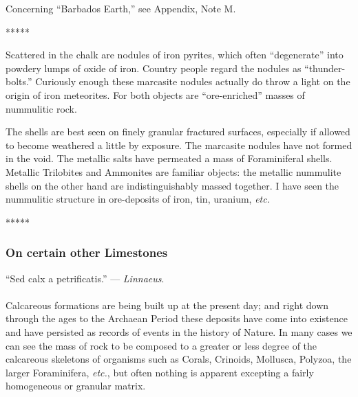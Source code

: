 \documentclass[a4paper, 12pt, oneside, landscape]{article}
\begin{document}
Concerning ``Barbados Earth,'' see Appendix, Note M.

\centerline{*\hspace{15mm}*\hspace{15mm}*\hspace{15mm}*\hspace{15mm}*}
\bigskip

Scattered in the chalk are nodules of iron pyrites, which often ``degenerate'' into powdery lumps of oxide of iron. Country people regard the nodules as ``thunder-bolts.'' Curiously enough these marcasite nodules actually do throw a light on the origin of iron meteorites. For both objects are ``ore-enriched'' masses of nummulitic rock.

The shells are best seen on finely granular fractured surfaces, especially if allowed to become weathered a little by exposure. The marcasite nodules have not formed in the void. The metallic salts have permeated a mass of Foraminiferal shells. Metallic Trilobites and Ammonites are familiar objects: the metallic nummulite shells on the other hand are indistinguishably massed together. I have seen the nummulitic structure in ore-deposits of iron, tin, uranium, \emph{etc.}

\centerline{*\hspace{15mm}*\hspace{15mm}*\hspace{15mm}*\hspace{15mm}*}
\bigskip

\subsubsection{On certain other Limestones}
\begin{displayquote}
``Sed calx a petrificatis.'' --- \emph{Linnaeus}.
\end{displayquote}
\paragraph{}
Calcareous formations are being built up at the present day; and right down through the ages to the Archaean Period these deposits have come into existence and have persisted as records of events in the history of Nature. In many cases we can see the mass of rock to be composed to a greater or less degree of the calcareous skeletons of organisms such as Corals, Crinoids, Mollusca, Polyzoa, the larger Foraminifera, \emph{etc.}, but often nothing is apparent excepting a fairly homogeneous or granular matrix.
\end{document}
